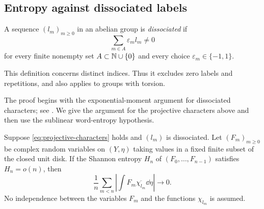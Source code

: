 \subsection{Entropy against dissociated labels}

\begin{definition}
A sequence $(l_m)_{m\ge0}$ in an abelian group is \emph{dissociated} if
\[
 \sum_{m\in A}\varepsilon_m l_m\ne0
\]
for every finite nonempty set $A\subset\mathbb N\cup\{0\}$ and every choice
$\varepsilon_m\in\{-1,1\}$.
\end{definition}

This definition concerns distinct indices. Thus it excludes zero labels and
repetitions, and also applies to groups with torsion.

The proof begins with the exponential-moment argument for dissociated
characters; see \cite[Section~2.2, Proposition~17]{Green2002SetAddition}.
We give the argument for the projective characters above and then use
the sublinear word-entropy hypothesis.

\begin{lemma}
\label{lem:entropy-cancellation}
Suppose \eqref{eq:projective-characters} holds and $(l_m)$ is dissociated.
Let $(F_m)_{m\ge0}$ be complex random variables on $(Y,\eta)$ taking values
in a fixed finite subset of the closed unit disk. If the Shannon entropy
$H_n$ of $(F_0,\ldots,F_{n-1})$ satisfies $H_n=o(n)$, then
\[
 \frac1n\sum_{m<n}\left|\int F_m\overline{\chi_{l_m}}\dd\eta\right|
 \longrightarrow0.
\]
No independence between the variables $F_m$ and the functions $\chi_{l_m}$
is assumed.
\end{lemma}

